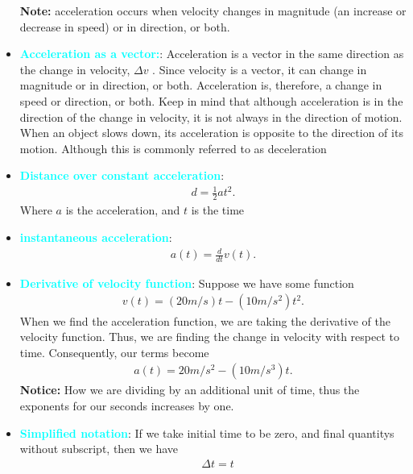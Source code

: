 \documentclass{report}
\begin{document}
\begin{itemize}
            \bigbreak \noindent 
            \textbf{Note:} acceleration occurs when velocity changes in magnitude (an increase or decrease in speed) or in direction, or both.
               \item \textbf{\textcolor{cyan}{Acceleration as a vector:}}: Acceleration is a vector in the same direction as the change in velocity,  $\Delta v$ . Since velocity is a vector, it can change in magnitude or in direction, or both. Acceleration is, therefore, a change in speed or direction, or both.
         \bigbreak \noindent 
         Keep in mind that although acceleration is in the direction of the change in velocity, it is not always in the direction of motion. When an object slows down, its acceleration is opposite to the direction of its motion. Although this is commonly referred to as deceleration
        \item \textbf{\textcolor{cyan}{Distance over constant acceleration}}:
            \begin{align*}
                d = \frac{1}{2}at^{2} 
            .\end{align*}
            Where $a$ is the acceleration, and $t$ is the time
        \item \textbf{\textcolor{cyan}{instantaneous acceleration}}:
            \begin{align*}
            a(t) = \frac{d}{dt}v(t)
            .\end{align*}
        \item \textbf{\textcolor{cyan}{Derivative of velocity function}}: Suppose we have some function 
            \begin{align*}
                v(t) = (20 m/s) t - (10 m/s^{2})t^{2}
            .\end{align*}
            When we find the acceleration function, we are taking the derivative of the velocity function. Thus, we are finding the change in velocity with respect to time. Consequently, our terms become
            \begin{align*}
                a(t) = 20 m/s^{2} - (10m/s^{3})t
            .\end{align*}
            \textbf{Notice:} How we are dividing by an additional unit of time, thus the exponents for our seconds increases by one.
        \item \textbf{\textcolor{cyan}{Simplified notation}}: If we take initial time to be zero, and final quantitys without subscript, then we have 
            \begin{align*}
               &\Delta t = t\\

\end{align*}
\end{itemize}
\end{document}
